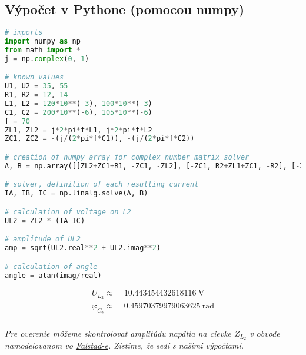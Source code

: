 \clearpage

\subsection{Výpočet v Pythone (pomocou numpy)}

\begin{lstlisting}[language=Python]
# imports
import numpy as np
from math import *
j = np.complex(0, 1)

# known values
U1, U2 = 35, 55
R1, R2 = 12, 14
L1, L2 = 120*10**(-3), 100*10**(-3)
C1, C2 = 200*10**(-6), 105*10**(-6)
f = 70
ZL1, ZL2 = j*2*pi*f*L1, j*2*pi*f*L2
ZC1, ZC2 = -(j/(2*pi*f*C1)), -(j/(2*pi*f*C2))

# creation of numpy array for complex number matrix solver
A, B = np.array([[ZL2+ZC1+R1, -ZC1, -ZL2], [-ZC1, R2+ZL1+ZC1, -R2], [-ZL2, -R2, ZC2+R2+ZL2]]), np.array([-U1, 0, -U2])

# solver, definition of each resulting current
IA, IB, IC = np.linalg.solve(A, B)

# calculation of voltage on L2
UL2 = ZL2 * (IA-IC)

# amplitude of UL2
amp = sqrt(UL2.real**2 + UL2.imag**2)

# calculation of angle 
angle = atan(imag/real)
\end{lstlisting}

\begin{equation*}
\begin{aligned}
U_{L_{2}} \approx& \; \SI{10.443454432618116}{\volt} \\
\varphi_{C_{2}} \approx& \; \SI{0.45970379979063625}{\radian} \\
\end{aligned}
\end{equation*}

\textit{Pre overenie môžeme skontrolovať amplitúdu napätia na cievke $Z_{L_{2}}$ v obvode namodelovanom vo \href{https://www.falstad.com/circuit/circuitjs.html?ctz=CQAgjCAMB0l3BWEBmAHAJmgdgGzoRmACzICcpkORI1SJAUAE4gC0x1Vr74p6U46egDcuRDtXRFIITtIhZpyJNJXQEwkJLm9NUlMhz950hMv4x1AY1HUwOsIbt9V8O+XcfPqVuizQi5OjIkPiUYuiQWPQANuCOOlo8zlDQEDBg6GCUOHgI6KQZBAhE9ADuutKciU5QMTb6jobIBuapfCwwyFhoqBimFF1EYGBMcUljzYZyJeVsYuNz1JO11g4NFesucFkBnnvkrMHQ6KhKqN2QxL2UggD2NGPSUqTeemDQU5oPyPT3ldRPSCkLCaRTHcBfRT0IA}{Falstad-e}. Zistíme, že sedí s našimi výpočtami.}